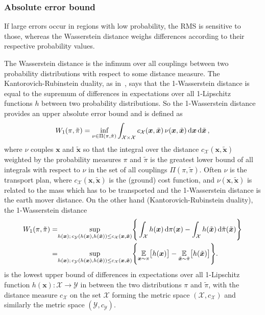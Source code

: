 \subsubsection{Absolute error bound}
\label{subsec:wasser}
If large errors occur in regions with low probability, the RMS is sensitive to those, whereas the Wasserstein distance weighs differences according to their respective probability values.

The Wasserstein distance is the infimum over all couplings between two probability distributions with respect to some distance measure.
The Kantorovich-Rubinstein duality, as in~\cite{thickstun2019kantorovich, Ambrosio2024Kanta}, says that the 1-Wasserstein distance is equal to the supremum of differences in expectations over all 1-Lipschitz functions $h$ between two probability distributions.
So the 1-Wasserstein distance provides an upper absolute error bound and is defined as
\begin{align}
	W_1(\pi,\tilde{\pi}) = \underset{  \nu \in \Pi(\pi,\tilde{\pi}) }{ \text{inf}}\int_{\mathcal{X} \times \mathcal{X}} c_{\mathcal{X}}(\bm{x},\tilde{\bm{x}}) \, \nu(\bm{x},\tilde{\bm{x}}) \mathop{}\!\mathrm{d} \bm{x} \mathop{}\!\mathrm{d} \tilde{\bm{x}}
	\label{eq:wass} \, ,
\end{align}
where $\nu$ couples $\bm{x}$ and $\tilde{\bm{x}}$ so that the integral over the distance $c_{\mathcal{X}}(\bm{x},\tilde{\bm{x}}) $ weighted by the probability measures $\pi$ and $\tilde{\pi}$ is the greatest lower bound of all integrals with respect to $\nu$ in the set of all couplings $ \Pi(\pi,\tilde{\pi})$.
Often $\nu$ is the transport plan, where $c_{\mathcal{X}}(\bm{x},\tilde{\bm{x}})$ is the (ground) cost function, and $\nu(\bm{x}, \tilde{\bm{x}})$ is related to the mass which has to be transported and the 1-Wasserstein distance is the earth mover distance.
On the other hand (Kantorovich-Rubinstein duality), the 1-Wasserstein distance
\begin{align}
	W_1(\pi,\tilde{\pi})  =& \underset{ h(\bm{x}); \, c_{\mathcal{Y}}(h(\bm{x}), h(\tilde{\bm{x}}) ) \leq  c_{\mathcal{X}}(\bm{x},\tilde{\bm{x}}) }{ \text{sup}} \Bigg\{  \int_{\mathcal{X}} h(\bm{x}) \mathop{}\!\mathrm{d} \pi (\bm{x})  - \int_{\mathcal{X}} h(\tilde{\bm{x}}) \mathop{}\!\mathrm{d} \tilde{\pi} (\tilde{\bm{x}}) \Bigg\} \\
	=& \underset{ h(\bm{x});  \, c_{\mathcal{Y}}(h(\bm{x}), h(\tilde{\bm{x}}) )  \leq  c_{\mathcal{X}}(\bm{x},\tilde{\bm{x}}) }{ \text{sup}}  \Bigg\{  \underset{\bm{x} \sim  \pi }{\mathbb{E}} \big[ h(\bm{x}) \big]  -  \underset{\tilde{\bm{x}}\sim \tilde{\pi}}{\mathbb{E}} \big[ h(\tilde{\bm{x}}) \big] \Bigg\} .
\end{align}
is the lowest upper bound of differences in expectations over all 1-Lipschitz function $h(\bm{x}) : \mathcal{X} \rightarrow \mathcal{Y}$ in between the two distributions $\pi$ and $\tilde{\pi}$, with the distance measure $c_{\mathcal{X}}$ on the set $\mathcal{X}$ forming the metric space $( \mathcal{X}, c_{\mathcal{X}} )$ and similarly the metric space $(\mathcal{Y}, c_{\mathcal{Y}})$.

